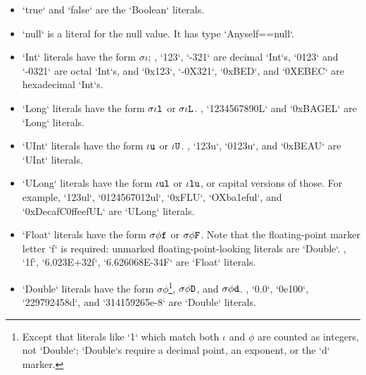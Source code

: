 \begin{itemize}

\item \xcd`true` and \xcd`false` are the \xcd`Boolean` literals.

\item \xcd`null` is a literal for the null value.  It has type
      \xcd`Any{self==null}`. 

\item \xcd`Int` literals have the form {$\sigma\iota$}; \eg, \xcd`123`,
      \xcd`-321` are decimal \xcd`Int`s, \xcd`0123` and \xcd`-0321` are octal
      \xcd`Int`s, and \xcd`0x123`, \xcd`-0X321`,  \xcd`0xBED`, and \xcd`0XEBEC` are
      hexadecimal \xcd`Int`s.  

\item \xcd`Long` literals have the form {$\sigma\iota{\tt l}$} or
      {$\sigma\iota{\tt L}$}. \Eg, \xcd`1234567890L`  and \xcd`0xBAGEL` are \xcd`Long` literals. 

\item \xcd`UInt` literals have the form {$\iota{\tt u}$} or {$\iota {\tt U}$}.
      \Eg, \xcd`123u`, \xcd`0123u`, and \xcd`0xBEAU` are \xcd`UInt` literals.

\item \xcd`ULong` literals have the form {$\iota {\tt ul}$} or {$\iota {\tt
      lu}$}, or capital versions of those.  For example, 
      \xcd`123ul`, \xcd`0124567012ul`,  \xcd`0xFLU`, \xcd`OXba1eful`, and \xcd`0xDecafC0ffeefUL` are \xcd`ULong`
      literals. 

\item \xcd`Float` literals have the form {$\sigma \phi {\tt f}$} or  {$\sigma
      \phi {\tt F}$}.  Note that the floating-point marker letter \xcd`f` is
      required: unmarked floating-point-looking literals are \xcd`Double`. 
      \Eg, \xcd`1f`, \xcd`6.023E+32f`, \xcd`6.626068E-34F` are \xcd`Float`
      literals. 

\item \xcd`Double` literals have the form {$\sigma \phi$}\footnote{Except that
      literals like \xcd`1` 
      which match both {$\iota$} and {$\phi$} are counted as
      integers, not \xcd`Double`; \xcd`Double`s require a decimal
      point, an exponent, or the \xcd`d` marker.
      }, {$\sigma \phi {\tt
      D}$}, and {$\sigma \phi {\tt d}$}.  
      \Eg, \xcd`0.0`, \xcd`0e100`, \xcd`229792458d`, and \xcd`314159265e-8`
      are \xcd`Double` literals.


\end{itemize}
